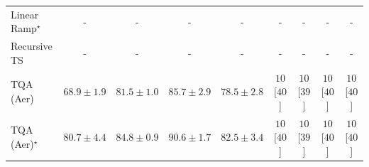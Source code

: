 \begin{tabular}{l|cccc|cccc|}
Linear Ramp$^\star$ & {\cellcolor[HTML]{000000}} \color[HTML]{F1F1F1} {\cellcolor{white}} \color{black} - & {\cellcolor[HTML]{000000}} \color[HTML]{F1F1F1} {\cellcolor{white}} \color{black} - & {\cellcolor[HTML]{000000}} \color[HTML]{F1F1F1} {\cellcolor{white}} \color{black} - & {\cellcolor[HTML]{000000}} \color[HTML]{F1F1F1} {\cellcolor{white}} \color{black} - & {\cellcolor[HTML]{000000}} \color[HTML]{F1F1F1} {\cellcolor{white}} \color{black} - & {\cellcolor[HTML]{000000}} \color[HTML]{F1F1F1} {\cellcolor{white}} \color{black} - & {\cellcolor[HTML]{000000}} \color[HTML]{F1F1F1} {\cellcolor{white}} \color{black} - & {\cellcolor[HTML]{000000}} \color[HTML]{F1F1F1} {\cellcolor{white}} \color{black} - \\
Recursive TS & {\cellcolor[HTML]{000000}} \color[HTML]{F1F1F1} {\cellcolor{white}} \color{black} - & {\cellcolor[HTML]{000000}} \color[HTML]{F1F1F1} {\cellcolor{white}} \color{black} - & {\cellcolor[HTML]{000000}} \color[HTML]{F1F1F1} {\cellcolor{white}} \color{black} - & {\cellcolor[HTML]{000000}} \color[HTML]{F1F1F1} {\cellcolor{white}} \color{black} - & {\cellcolor[HTML]{000000}} \color[HTML]{F1F1F1} {\cellcolor{white}} \color{black} - & {\cellcolor[HTML]{000000}} \color[HTML]{F1F1F1} {\cellcolor{white}} \color{black} - & {\cellcolor[HTML]{000000}} \color[HTML]{F1F1F1} {\cellcolor{white}} \color{black} - & {\cellcolor[HTML]{000000}} \color[HTML]{F1F1F1} {\cellcolor{white}} \color{black} - \\
TQA (Aer) & {\cellcolor[HTML]{FFFFE5}} \color[HTML]{000000} $68.9\pm 1.9$ & {\cellcolor[HTML]{FC9427}} \color[HTML]{000000} $81.5\pm 1.0$ & {\cellcolor[HTML]{DC5E0B}} \color[HTML]{F1F1F1} $85.7\pm 2.9$ & {\cellcolor[HTML]{FEBE4A}} \color[HTML]{000000} $78.5\pm 2.8$ & {\cellcolor[HTML]{FFF7F3}} \color[HTML]{000000} $10$ [$40$] & {\cellcolor[HTML]{FFF7F3}} \color[HTML]{000000} $10$ [$39$] & {\cellcolor[HTML]{FFF7F3}} \color[HTML]{000000} $10$ [$40$] & {\cellcolor[HTML]{FFF7F3}} \color[HTML]{000000} $10$ [$40$] \\
TQA (Aer)$^\star$ & {\cellcolor[HTML]{FE9F2E}} \color[HTML]{000000} $80.7\pm 4.4$ & {\cellcolor[HTML]{E56910}} \color[HTML]{F1F1F1} $84.8\pm 0.9$ & {\cellcolor[HTML]{943304}} \color[HTML]{F1F1F1} $90.6\pm 1.7$ & {\cellcolor[HTML]{F6861F}} \color[HTML]{F1F1F1} $82.5\pm 3.4$ & {\cellcolor[HTML]{FFF7F3}} \color[HTML]{000000} $10$ [$40$] & {\cellcolor[HTML]{FFF7F3}} \color[HTML]{000000} $10$ [$39$] & {\cellcolor[HTML]{FFF7F3}} \color[HTML]{000000} $10$ [$40$] & {\cellcolor[HTML]{FFF7F3}} \color[HTML]{000000} $10$ [$40$] \\

\end{tabular}
